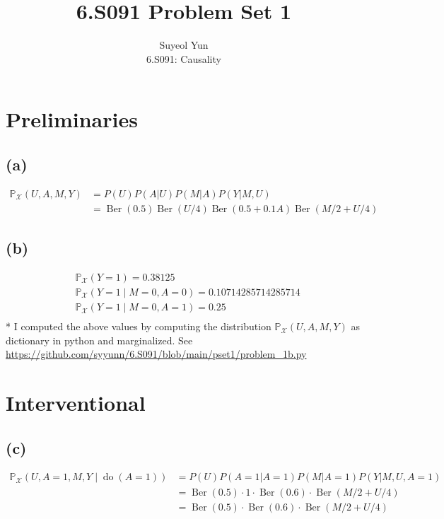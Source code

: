 \documentclass[10pt]{article}
\begin{document}
 
\title{6.S091 Problem Set 1}
\author{Suyeol Yun\\
6.S091: Causality}
\maketitle
 
\section{Preliminaries}
\subsection{(a)} 
\begin{align*}
\mathbb{P}_{\mathcal{X}}(U, A, M, Y) &= P(U)P(A|U)P(M|A)P(Y|M, U) \\
&= \operatorname{Ber}(0.5) \operatorname{Ber}(U/4) \operatorname{Ber}(0.5 + 0.1A)\operatorname{Ber}(M/2 + U/4)
\end{align*}

\subsection{(b)}
\begin{align*}
&\mathbb{P}_{\mathcal{X}}(Y=1) = 0.38125\\
&\mathbb{P}_{\mathcal{X}}(Y=1 \mid M=0, A=0)= 0.10714285714285714\\
&\mathbb{P}_{\mathcal{X}}(Y=1 \mid M=0, A=1)= 0.25\\
\end{align*}
* I computed the above values by computing the distribution $\mathbb{P}_{\mathcal{X}}(U, A, M, Y)$ as dictionary in python and marginalized. 
See \url{https://github.com/syyunn/6.S091/blob/main/pset1/problem_1b.py}


\section{Interventional}
\subsection{(c)}

\begin{align*}
\mathbb{P}_{\mathcal{X}}(U, A=1, M, Y \mid \operatorname{do}(A=1)) &=  P(U)P(A=1|A=1)P(M|A=1)P(Y|M, U, A=1)\\
&= \operatorname{Ber}(0.5)\cdot1\cdot\operatorname{Ber}(0.6)\cdot\operatorname{Ber}(M/2 + U/4)\\
&= \operatorname{Ber}(0.5)\cdot\operatorname{Ber}(0.6)\cdot\operatorname{Ber}(M/2 + U/4)
\end{align*}    
\end{document}
